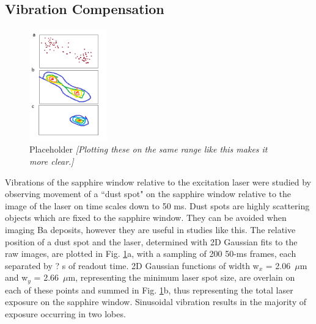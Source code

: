 \documentclass[aps,pra,reprint,superscriptaddress]{revtex4-1}
\begin{document}


\subsection{Vibration Compensation}
\label{subsec:vibes}

\begin{figure}
\includegraphics[width=0.3\textwidth]{figures/vibes_placeholder.png}
\caption{Placeholder \emph{[Plotting these on the same range like this makes it more clear.]}}
\label{fig:vibes}
\end{figure}

Vibrations of the sapphire window relative to the excitation laser were studied by observing movement of a ``dust spot" on the sapphire window relative to the image of the laser on time scales down to 50 ms.  Dust spots are highly scattering objects which are fixed to the sapphire window.  They can be avoided when imaging Ba deposits, however they are useful in studies like this.  The relative position of a dust spot and the laser, determined with 2D Gaussian fits to the raw images, are plotted in Fig. \ref{fig:vibes}a, with a sampling of {\color{gray}200 50-}ms frames, each separated by {\color{gray}?} s of readout time.  2D Gaussian functions of width w$_{x}$ = 2.06~$\mu$m and w$_{y}$ = 2.66~$\mu$m, representing the minimum laser spot size, are overlain on each of these points and summed in Fig. \ref{fig:vibes}b, thus representing the total laser exposure on the sapphire window.  Sinusoidal vibration results in the majority of exposure occurring in two lobes.

\end{document}
